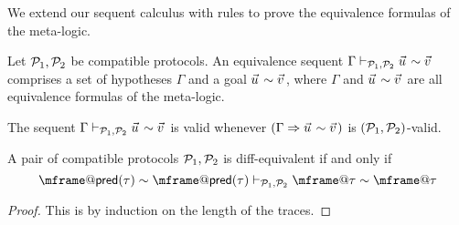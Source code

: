 We extend our sequent calculus with rules to prove the equivalence formulas of the meta-logic.

\begin{definition}
  Let $\mathcal{P}_1,\mathcal{P}_2$ be compatible protocols. An equivalence sequent $\Gamma \vdash_{\calp_1,\calp_2} \pvec{u} \sim \pvec{v}$ comprises a set of hypotheses $\Gamma$ and a goal $\pvec{u} \sim \pvec{v}$, where $\Gamma$ and $\pvec{u} \sim \pvec{v}$ are all equivalence formulas of the meta-logic.

  The sequent  $\Gamma \vdash_{\calp_1,\calp_2} \pvec{u} \sim \pvec{v}$ is valid whenever $(\Gamma \Rightarrow \pvec{u} \sim \pvec{v})$ is $(\mathcal{P}_1,\mathcal{P}_2)$-valid.
\end{definition}

\begin{lemma}
  A pair of compatible protocols $\mathcal{P}_1,\mathcal{P}_2$ is diff-equivalent if and only if
  \[
    \mframe@\pre(\tau) \sim \mframe@\pre(\tau)
    \vdash_{\calp_1,\calp_2}
    \mframe@\tau \sim \mframe@\tau
  \]
\end{lemma}
\begin{proof}
  This is by induction on the length of the traces.
\end{proof}


